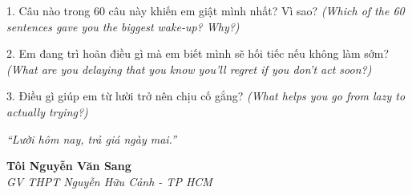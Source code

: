 \begin{tuhocnhanh}
1. Câu nào trong 60 câu này khiến em giật mình nhất? Vì sao? \textit{(Which of the 60 sentences gave you the biggest wake-up? Why?)}

2. Em đang trì hoãn điều gì mà em biết mình sẽ hối tiếc nếu không làm sớm? \textit{(What are you delaying that you know you'll regret if you don't act soon?)}

3. Điều gì giúp em từ lười trở nên chịu cố gắng? \textit{(What helps you go from lazy to actually trying?)}
\end{tuhocnhanh}

\begin{center}
\textit{\color{accentsgold}``Lười hôm nay, trả giá ngày mai.''}
\end{center}

\begin{flushright}
\textbf{Tôi Nguyễn Văn Sang}\\
\textit{GV THPT Nguyễn Hữu Cảnh - TP HCM}
\end{flushright}

\ngancach
